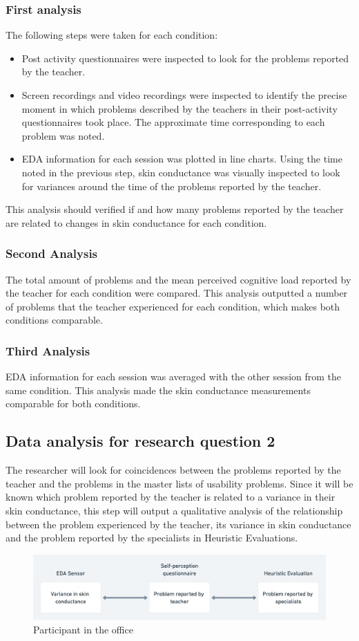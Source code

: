 \subsubsection{First analysis}
The following steps were taken for each condition:
\begin{itemize}
    \item Post activity questionnaires were inspected to look for the problems reported by the teacher.
    \item Screen recordings and video recordings were inspected to identify the precise moment in which problems described by the teachers in their post-activity questionnaires took place. The approximate time corresponding to each problem was noted.
    \item EDA information for each session was plotted in line charts. Using the time noted in the previous step, skin conductance was visually inspected to look for variances around the time of the problems reported by the teacher.
\end{itemize}
This analysis should verified if and how many problems reported by the teacher are related to changes in skin conductance for each condition.
\subsubsection{Second Analysis}
The total amount of problems and the mean perceived cognitive load reported by the teacher for each condition were compared. This analysis outputted a number of problems that the teacher experienced for each condition, which makes both conditions comparable.
\subsubsection{Third Analysis}
EDA information for each session was averaged with the other session from the same condition. This analysis made the skin conductance measurements comparable for both conditions.
\subsection{Data analysis for research question 2}
The researcher will look for coincidences between the problems reported by the teacher and the problems in the master lists of usability problems. Since it will be known which problem reported by the teacher is related to a variance in their skin conductance, this step will output a qualitative analysis of the relationship between the problem experienced by the teacher, its variance in skin conductance and the problem reported by the specialists in Heuristic Evaluations.
\begin{figure}[!h]
    \includegraphics[clip,width=\columnwidth]{Figures/Heuristic-evaluation-diagram.png} 
\caption{Participant in the office} 
\label{fig:table}
\end{figure}

